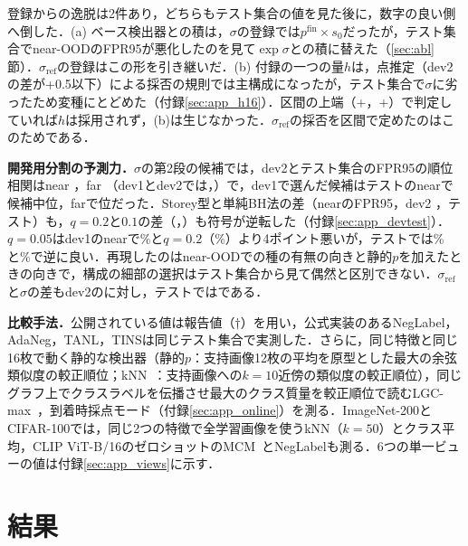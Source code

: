 \documentclass[MIRU,submit]{miru2025j}
\newcommand\secref[1]{\ref{sec:#1}節}
\newcommand\FPR{FPR95}
\newcommand\pfin{p^{\mathrm{fin}}}
\newcommand\sR{\sigma_{\mathrm{ref}}}
\begin{document}
登録からの逸脱は2件あり，どちらもテスト集合の値を見た後に，数字の良い側へ倒した．(a) ベース検出器との積は，$\sigma$の登録では$\pfin\times s_0$だったが，テスト集合でnear-OODの\FPR{}が悪化したのを見て$\exp\sigma$との積に替えた（\secref{abl}）．$\sR$の登録はこの形を引き継いだ．(b) 付録の一つの量$h$は，点推定（dev2の差が+0.5以下）による採否の規則では主構成になったが，テスト集合で$\sigma$に劣ったため変種にとどめた（付録\ref{sec:app_h16}）．区間の上端（+\NRHsUpperNear，+\NRHsUpperFar）で判定していれば$h$は採用されず，(b)は生じなかった．$\sR$の採否を区間で定めたのはこのためである．

\textbf{開発用分割の予測力．}$\sigma$の第2段の\NRDtNCand{}候補では，dev2とテスト集合の\FPR{}の順位相関はnear \NRDtNearSpDevTwoTest{}，far \NRDtFarSpDevTwoTest{}（dev1とdev2では\NRDtNearSpDevOneDevTwo{}，\NRDtFarSpDevOneDevTwo{}）で，dev1で選んだ候補はテストのnearで\NRDtNCand{}候補中\NRDtNearRankOnTest{}位，farで\NRDtFarRankChosen{}位だった．Storey型と単純BH法の差（nearの\FPR{}，dev2 \NRDtNearStoreyBhDevTwo{}，テスト\NRDtNearStoreyBhTest{}）も，$q{=}0.2$と$0.1$の差（\NRDtNearQDevTwo{}，\NRDtNearQTest{}）も符号が逆転した（付録\ref{sec:app_devtest}）．$q{=}0.05$はdev1のnearで\NRDtQFiveDevOneNear\%と$q{=}0.2$（\NRDtQTwentyDevOneNear\%）より4ポイント悪いが，テストでは\NRDtQFiveTestNear\%と\NRDtQTwentyTestNear\%で逆に良い．再現したのはnear-OODでの種の有無の向きと静的$p$を加えたときの向きで，構成の細部の選択はテスト集合から見て偶然と区別できない．$\sR$と$\sigma$の差もdev2の\NRDevTwoNearD{}に対し，テストでは\NRAloneNearDSig{}である．

\textbf{比較手法．}公開されている値は報告値（$\dagger$）を用い，公式実装のあるNegLabel，AdaNeg，TANL，TINSは同じテスト集合で実測した．さらに，同じ特徴と同じ16枚で動く静的な検出器（静的$p$：支持画像12枚の平均を原型とした最大の余弦類似度の較正順位；kNN~\cite{sun2022knn}：支持画像への$k{=}10$近傍の類似度の較正順位），同じグラフ上でクラスラベルを伝播させ最大のクラス質量を較正順位で読むLGC-max~\cite{zhou2004lgc,liu2019tpn}，到着時採点モード（付録\ref{sec:app_online}）を測る．ImageNet-200とCIFAR-100では，同じ2つの特徴で全学習画像を使うkNN（$k{=}50$）とクラス平均，CLIP ViT-B/16のゼロショットのMCM~\cite{ming2022mcm}とNegLabelも測る．6つの単一ビューの値は付録\ref{sec:app_views}に示す．

\section{結果}
\end{document}
